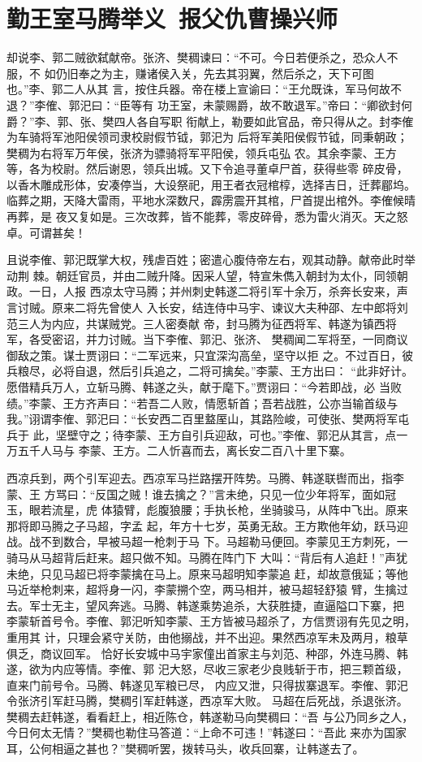 \chapter{勤王室马腾举义~报父仇曹操兴师}

却说李、郭二贼欲弑献帝。张济、樊稠谏曰：“不可。今日若便杀之，恐众人不服，不
如仍旧奉之为主，赚诸侯入关，先去其羽翼，然后杀之，天下可图也。”李、郭二人从其
言，按住兵器。帝在楼上宣谕曰：“王允既诛，军马何故不退？”李傕、郭汜曰：“臣等有
功王室，未蒙赐爵，故不敢退军。”帝曰：“卿欲封何爵？”李、郭、张、樊四人各自写职
衔献上，勒要如此官品，帝只得从之。封李傕为车骑将军池阳侯领司隶校尉假节钺，郭汜为
后将军美阳侯假节钺，同秉朝政；樊稠为右将军万年侯，张济为骠骑将军平阳侯，领兵屯弘
农。其余李蒙、王方等，各为校尉。然后谢恩，领兵出城。又下令追寻董卓尸首，获得些零
碎皮骨，以香木雕成形体，安凑停当，大设祭祀，用王者衣冠棺椁，选择吉日，迁葬郿坞。
临葬之期，天降大雷雨，平地水深数尺，霹雳震开其棺，尸首提出棺外。李傕候晴再葬，是
夜又复如是。三次改葬，皆不能葬，零皮碎骨，悉为雷火消灭。天之怒卓。可谓甚矣！

且说李傕、郭汜既掌大权，残虐百姓；密遣心腹侍帝左右，观其动静。献帝此时举动荆
棘。朝廷官员，并由二贼升降。因采人望，特宣朱儁入朝封为太仆，同领朝政。一日，人报
西凉太守马腾；并州刺史韩遂二将引军十余万，杀奔长安来，声言讨贼。原来二将先曾使人
入长安，结连侍中马宇、谏议大夫种邵、左中郎将刘范三人为内应，共谋贼党。三人密奏献
帝，封马腾为征西将军、韩遂为镇西将军，各受密诏，并力讨贼。当下李傕、郭汜、张济、
樊稠闻二军将至，一同商议御敌之策。谋士贾诩曰：“二军远来，只宜深沟高垒，坚守以拒
之。不过百日，彼兵粮尽，必将自退，然后引兵追之，二将可擒矣。”李蒙、王方出曰：
“此非好计。愿借精兵万人，立斩马腾、韩遂之头，献于麾下。”贾诩曰：“今若即战，必
当败绩。”李蒙、王方齐声曰：“若吾二人败，情愿斩首；吾若战胜，公亦当输首级与
我。”诩谓李傕、郭汜曰：“长安西二百里盩厔山，其路险峻，可使张、樊两将军屯兵于
此，坚壁守之；待李蒙、王方自引兵迎敌，可也。”李傕、郭汜从其言，点一万五千人马与
李蒙、王方。二人忻喜而去，离长安二百八十里下寨。

西凉兵到，两个引军迎去。西凉军马拦路摆开阵势。马腾、韩遂联辔而出，指李蒙、王
方骂曰：“反国之贼！谁去擒之？”言未绝，只见一位少年将军，面如冠玉，眼若流星，虎
体猿臂，彪腹狼腰；手执长枪，坐骑骏马，从阵中飞出。原来那将即马腾之子马超，字孟
起，年方十七岁，英勇无敌。王方欺他年幼，跃马迎战。战不到数合，早被马超一枪刺于马
下。马超勒马便回。李蒙见王方刺死，一骑马从马超背后赶来。超只做不知。马腾在阵门下
大叫：“背后有人追赶！”声犹未绝，只见马超已将李蒙擒在马上。原来马超明知李蒙追
赶，却故意俄延；等他马近举枪刺来，超将身一闪，李蒙搠个空，两马相并，被马超轻舒猿
臂，生擒过去。军士无主，望风奔逃。马腾、韩遂乘势追杀，大获胜捷，直逼隘口下寨，把
李蒙斩首号令。李傕、郭汜听知李蒙、王方皆被马超杀了，方信贾诩有先见之明，重用其
计，只理会紧守关防，由他搦战，并不出迎。果然西凉军未及两月，粮草俱乏，商议回军。
恰好长安城中马宇家僮出首家主与刘范、种邵，外连马腾、韩遂，欲为内应等情。李傕、郭
汜大怒，尽收三家老少良贱斩于市，把三颗首级，直来门前号令。马腾、韩遂见军粮已尽，
内应又泄，只得拔寨退军。李傕、郭汜令张济引军赶马腾，樊稠引军赶韩遂，西凉军大败。
马超在后死战，杀退张济。樊稠去赶韩遂，看看赶上，相近陈仓，韩遂勒马向樊稠曰：“吾
与公乃同乡之人，今日何太无情？”樊稠也勒住马答道：“上命不可违！”韩遂曰：“吾此
来亦为国家耳，公何相逼之甚也？”樊稠听罢，拨转马头，收兵回寨，让韩遂去了。

